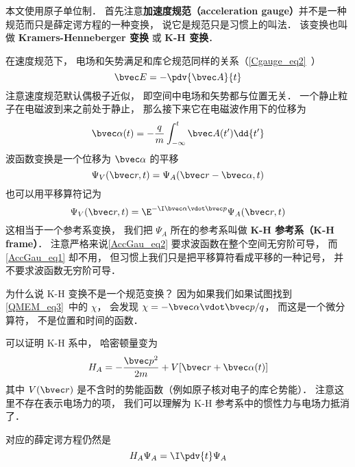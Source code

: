 

本文使用原子单位制． 首先注意\textbf{加速度规范（acceleration gauge）}并不是一种规范而只是薛定谔方程的一种变换， 说它是规范只是习惯上的叫法． 该变换也叫做 \textbf{Kramers-Henneberger 变换} 或 \textbf{K-H 变换}．

在速度规范下， 电场和矢势满足和库仑规范同样的关系（\autoref{Cgauge_eq2}~）
\begin{equation}
\bvec E = -\pdv{\bvec A}{t}
\end{equation}
注意速度规范默认偶极子近似， 即空间中电场和矢势都与位置无关． 一个静止粒子在电磁波到来之前处于静止， 那么接下来它在电磁波作用下的位移为
\begin{equation}\label{AccGau_eq3}
\bvec \alpha(t) = -\frac{q}{m}\int_{-\infty}^t \bvec A(t') \dd{t'}
\end{equation}
波函数变换是一个位移为 $\bvec \alpha$ 的平移
\begin{equation}\label{AccGau_eq1}
\Psi_V(\bvec r, t) = \Psi_A(\bvec r - \bvec \alpha, t)
\end{equation}
也可以用平移算符记为
\begin{equation}\label{AccGau_eq2}
\Psi_V(\bvec r, t) = \E^{-\I \bvec \alpha \vdot \bvec p} \Psi_A(\bvec r, t)
\end{equation}
这相当于一个参考系变换， 我们把 $\Psi_A$ 所在的参考系叫做 \textbf{K-H 参考系（K-H frame）}． 注意严格来说\autoref{AccGau_eq2} 要求波函数在整个空间无穷阶可导， 而\autoref{AccGau_eq1} 却不用， 但习惯上我们只是把平移算符看成平移的一种记号， 并不要求波函数无穷阶可导．

为什么说 K-H 变换不是一个规范变换？ 因为如果我们如果试图找到\autoref{QMEM_eq3}~中的 $\chi$， 会发现 $\chi = -\bvec \alpha \vdot \bvec p/q$， 而这是一个微分算符， 不是位置和时间的函数．

可以证明 K-H 系中， 哈密顿量变为
\begin{equation}
H_A = -\frac{\bvec p^2}{2m} + V[\bvec r + \bvec \alpha(t)]
\end{equation}
其中 $V(\bvec r)$ 是不含时的势能函数（例如原子核对电子的库仑势能）． 注意这里不存在表示电场力的项， 我们可以理解为 K-H 参考系中的惯性力与电场力抵消了．

对应的薛定谔方程仍然是
\begin{equation}
H_A \Psi_A = \I \pdv{t} \Psi_A
\end{equation}
